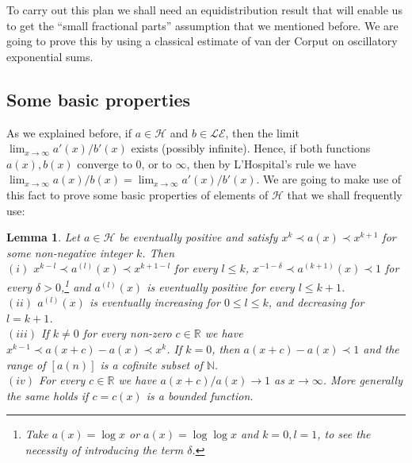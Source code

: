\documentclass[11pt]{amsart}
\newcommand{\LE}{\mathcal{LE}}
\renewcommand{\H}{\mathcal{H}}
\newcommand{\R}{\mathbb{R}}
\newcommand{\N}{\mathbb{N}}
\theoremstyle{plain}
\newtheorem{lemma}[theorem]{Lemma}
\theoremstyle{definition}
\theoremstyle{remark}
\begin{document}
To carry out this plan we shall need an equidistribution result that
will enable us to get the ``small fractional parts'' assumption that
we mentioned before.  We are going to prove this by using a classical estimate
of van der Corput on oscillatory exponential sums.

\subsection{Some basic properties}
As we explained before,  if $a\in \H$ and $b\in \LE$, then the limit $\lim_{x\to\infty} a'(x)/b'(x)$ exists
(possibly infinite). Hence, if both  functions  $a(x), b(x)$ converge to $0$, or to $\infty$,
then by L'Hospital's rule we have   $\lim_{x\to\infty} a(x)/b(x)=\lim_{x\to\infty} a'(x)/b'(x)$.
  We are going to make use of this fact to  prove
some  basic properties of elements of $\H$ that we
shall frequently use:
\begin{lemma}\label{L:basic}
  Let $a\in \H$ be eventually positive and satisfy $x^{k} \prec
  a(x)\prec x^{k+1}$ for some non-negative integer $k$.
  Then  \\
  $(i)$ $x^{k-l}\prec a^{(l)}(x)\prec x^{k+1-l}$ for every $l\leq k$,
  $x^{-1-\delta}\prec a^{(k+1)}(x)\prec 1$ for every
  $\delta>0$,\footnote{Take $a(x)=\log x$ or $a(x)=\log\log x$ and
    $k=0,l=1$, to see the necessity of introducing the term $\delta$.}
  and $a^{(l)}(x)$ is eventually positive for every $l\leq k+1$.\\
  $(ii)$ $a^{(l)}(x)$
  is eventually increasing for $0\leq l\leq k$, and decreasing for $l=k+1$.\\
  $(iii)$ If $k\neq 0$ for every non-zero $c\in\R$ we have
  $x^{k-1}\prec a(x+c)-a(x)\prec x^k$.
  If $k=0$, then $a(x+c)-a(x)\prec 1$ and the range of $[a(n)]$ is a cofinite subset of $\N$.\\
  $(iv)$ For every $c\in \R$ we have $a(x+c)/a(x)\to 1$ as
  $x\to\infty$. More generally the same holds if $c=c(x)$ is a bounded
  function.
\end{lemma}
\end{document}

